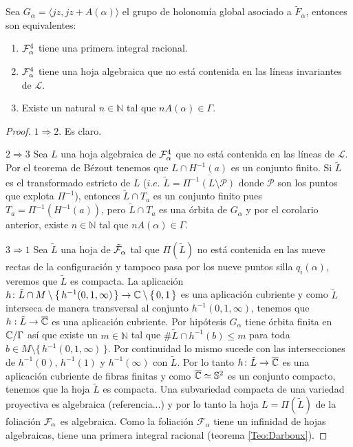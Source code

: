 \begin{Proposicion}
\label{Prop:EquivalenciasIntegrabilidad}
Sea $G_{\alpha}=\langle jz,jz+A(\alpha)\rangle$ el grupo de holonomía global asociado a $\tilde{F}_{\alpha}$, entonces son equivalentes:
\begin{enumerate}
\item $\mathcal{F}_{\alpha}^{4}$ tiene una primera integral racional.
\item $\mathcal{F}_{\alpha}^{4}$ tiene una hoja algebraica que no está contenida en las líneas invariantes de $\mathcal{L}$.
\item Existe un natural $n\in\mathbb{N}$ tal que $nA(\alpha)\in\Gamma$.
\end{enumerate}
\end{Proposicion} 
\begin{proof}
$1\Rightarrow 2$. Es claro.

\noindent $2\Rightarrow 3$ Sea $L$ una hoja algebraica de $\mathcal{F}_{\alpha}^{4}$ que no está contenida en las líneas de $\mathcal{L}$. Por el teorema de Bézout tenemos que $L\cap H^{-1}(a)$ es un conjunto finito. Si $\tilde{L}$ es el transformado estricto de $L$ ($\mathit{i.e.}$ $\tilde{L}=\overline{\Pi^{-1}(L\setminus\mathcal{P})}$ donde $\mathcal{P}$ son los puntos que explota $\Pi^{-1}$), entonces $\tilde{L}\cap T_{a}$ es un conjunto finito pues $T_{a}=\Pi^{-1}(H^{-1}(a))$, pero $\tilde{L}\cap T_{a}$ es una órbita de $G_{\alpha}$ y por el corolario anterior, existe $n\in\mathbb{N}$ tal que $nA(\alpha)\in\Gamma$.

\noindent $3\Rightarrow 1$ Sea $\tilde{L}$ una hoja de $\tilde{\mathcal{F}}_{\alpha}$ tal que $\Pi(\tilde{L})$ no está contenida en las nueve rectas de la configuración y tampoco pasa por los nueve puntos silla $q_{i}(\alpha)$, veremos que $\tilde{L}$ es compacta. La aplicación $h\colon\tilde{L}\cap M\setminus\{\, h^{-1}(0,1,\infty)\,\}\rightarrow\mathbb{C}\setminus \{\, 0,1 \, \}$ es una aplicación cubriente y como $\tilde{L}$ interseca de manera transversal al conjunto $h^{-1}(0,1,\infty)$, tenemos que $h:\tilde{L}\rightarrow\overline{\mathbb{C}}$ es una aplicación cubriente. Por hipótesis $G_{\alpha}$ tiene órbita finita en $\mathbb{C}/\Gamma$ así que existe un $m\in\mathbb{N}$ tal que $\#\tilde{L}\cap h^{-1}(b)\leq m$ para toda $b\in M\setminus\{\, h^{-1}(0,1,\infty)\,\}$. Por continuidad lo mismo sucede con las intersecciones de $h^{-1}(0),\, h^{-1}(1)$ y $h^{-1}(\infty)$ con $\tilde{L}$. Por lo tanto $h\colon\tilde{L}\rightarrow\overline{\mathbb{C}}$ es una aplicación cubriente de fibras finitas y como $\overline{\mathbb{C}}\simeq\mathbb{S}^{2}$ es un conjunto compacto, tenemos que la hoja $\tilde{L}$ es compacta. Una subvariedad compacta de una variedad proyectiva es algebraica (referencia...) y por lo tanto la hoja $L=\Pi(\tilde{L})$ de la foliación $\mathcal{F}_{\alpha}$ es algebraica. Como la foliación $\mathcal{F}_{\alpha}$ tiene un infinidad de hojas algebraicas, tiene una primera integral racional (teorema \ref{Teo:Darboux}).
\end{proof}
